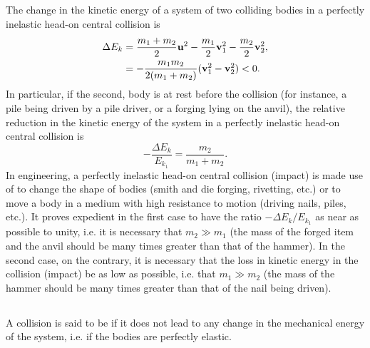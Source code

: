 \subsection{}\label{3.5.4} The change in the kinetic energy of a system of two collid­ing bodies in a perfectly inelastic head-on central collision is
\begin{align*}%
\Delta E_{k} & = \frac{m_{1}+ m_{2}}{2} \vb{u}^{2} -  \frac{m_{1}}{2} \vb{v}^{2}_{1}-  \frac{m_{2}}{2} \vb{v}^{2}_{2}, \\
& = -\frac{m_{1}m_{2}}{2(m_{1}+m_{2})} (\vb{v}_{1}^{2} -\vb{v}_{2}^{2} ) < 0.
\end{align*}
In particular, if the second, body is at rest before the collision (for instance, a pile being driven by a pile driver, or a forging lying on the anvil), the relative reduction in the kinetic energy of the system in a perfectly inelastic head-on central collision is
\begin{equation*}%
- \frac{\Delta E_{k}}{E_{k_{1}}} = \frac{ m_{2}}{m_{1}+m_{2}}.
\end{equation*}
In engineering, a perfectly inelastic head-on central collision (impact) is made use of to change the shape of bodies (smith and die forging, rivetting, etc.) or to move a body in a medium with high resistance to motion (driving nails, piles, etc.). It proves expedient in the first case to have the ratio $-\Delta E_{k}/E_{k_{1}}$ as near as possible to unity, i.e. it is necessary that $m_{2} \gg m_{1}$ (the mass of the forged item and the anvil should be many times greater than that of the hammer). In the second case, on the contrary, it is necessary that the loss in kinetic energy in the collision (impact) be as low as possible, i.e. that $m_{1} \gg m_{2}$ (the mass of the hammer should be many times greater than that of the nail being driven).

\subsection{}\label{3.5.5}A collision is said to be  if it does not lead to any change in the mechanical energy of the system, i.e. if the bodies are perfectly elastic.

